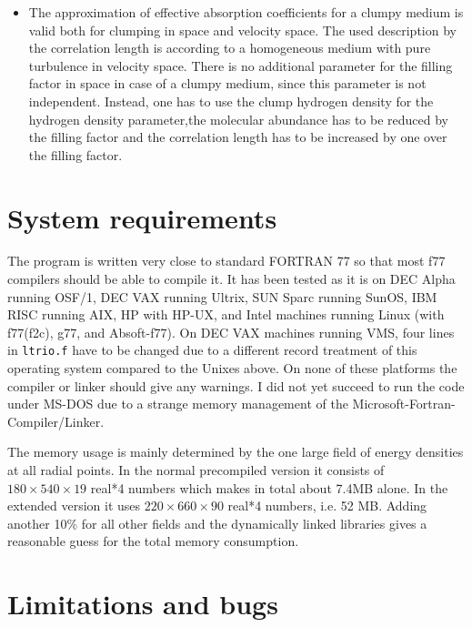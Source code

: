 \begin{itemize}
velocity dispersion range from 0.74 for L1228 down to values around 0.5
for relatively many objects. For a homogeneous isotropic infinite 
turbulence, there is also a theoretical relation between $\gamma$ and 
the correlation length: $\gamma \propto 1/\ln(r\sub{c})$ showing a general
anticorrelation. 
\item{}The approximation of effective absorption coefficients for a 
clumpy medium is valid both for clumping in space and velocity space.
The used description by the correlation length is according to a
homogeneous medium with pure turbulence in velocity space. There is
no additional parameter for the filling factor in space
in case of a clumpy medium, since this parameter is not independent.
Instead, one has to use the clump hydrogen density for the hydrogen 
density parameter,the molecular abundance has to be reduced by the 
filling factor and the correlation length has to be increased by one 
over the filling factor.
\end{itemize}

\section{System requirements}

The program is written very close to standard FORTRAN 77 so that most 
f77 compilers should be able to compile it.
It has been tested as it is on DEC Alpha running OSF/1, DEC VAX
running Ultrix, SUN Sparc running SunOS, IBM RISC running AIX, HP
with HP-UX, and Intel machines running Linux (with f77(f2c), g77, 
and Absoft-f77). 
On DEC VAX machines running VMS, four lines in {\tt ltrio.f} have to be 
changed due to a different record treatment of this operating
system compared to the Unixes above. On none of these platforms
the compiler or linker should give any warnings. I did not yet succeed to
run the code under MS-DOS due to a strange memory management of the
Microsoft-Fortran-Compiler/Linker.

The memory usage is mainly determined by the one large field
of energy densities at all radial points. In the normal precompiled 
version it consists of $180\times 540\times 19$ real*4
numbers which makes in total about 7.4MB alone. In the extended
version it uses $220\times 660\times 90$ real*4 numbers, i.e.
52 MB.  Adding another 10\% for all other fields
and the dynamically linked libraries gives a reasonable guess for 
the total memory consumption.

\section{Limitations and bugs}

